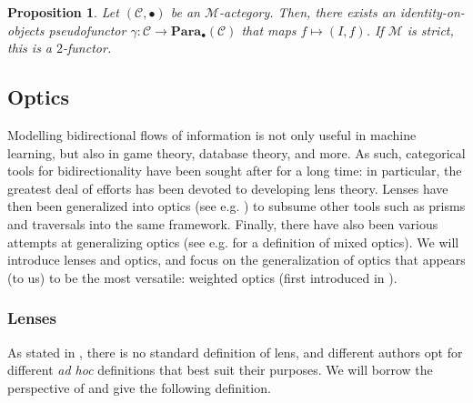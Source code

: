 \documentclass[12pt,a4paper,openright,twoside]{report}
\theoremstyle{plain}
\newtheorem{proposition}{Proposition}
\theoremstyle{definition}
\begin{document}
\begin{proposition}
  \label{prop: embeddingth}
  Let $(\mathcal{C}, \bullet)$ be an $\mathcal{M}$-actegory. Then, there exists an identity-on-objects pseudofunctor $\gamma: \mathcal{C} \to \mathbf{Para}_\bullet(\mathcal{C})$ that maps $f \mapsto (I,f)$. If $\mathcal{M}$ is strict, this is a $2$-functor.
\end{proposition}




\subsection{Optics}

Modelling bidirectional flows of information is not only useful in machine learning, but also in game theory, database theory, and more. As such, categorical tools for bidirectionality have been sought after for a long time: in particular, the greatest deal of efforts has been devoted to developing lens theory. Lenses have then been generalized into optics (see e.g. \cite{riley2018categories}) to subsume other tools such as prisms and traversals into the same framework. Finally, there have also been various attempts at generalizing optics (see e.g. \cite{clarke2024profunctor} for a definition of mixed optics). We will introduce lenses and optics, and focus on the generalization of optics that appears (to us) to be the most versatile: weighted optics (first introduced in \cite{gavranovic2024fundamental}). 


\subsubsection{Lenses}

As stated in \cite{gavranovic2024fundamental}, there is no standard definition of lens, and different authors opt for different \textit{ad hoc} definitions that best suit their purposes. We will borrow the perspective of \cite{cruttwell2022categorical} and give the following definition.
\end{document}
